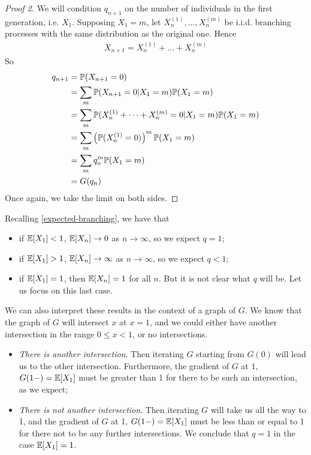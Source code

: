 \documentclass{../../template/note}
\begin{document}
    \begin{proof}[Proof 2]
        We will condition \(q_{n+1}\) on the number of individuals in the first generation, i.e. \(X_1\). Supposing \(X_1 = m\), let \(X_n^{(1)}, \dots, X_n^{(m)}\) be i.i.d. branching processes with the same distribution as the original one. Hence
        \begin{align*}
            X_{n+1} = X_n^{(1)} + \dots + X_n^{(m)}
        \end{align*}
        So
        \begin{align*}
            q_{n+1} &= \mathbb P(X_{n+1} = 0) \\
            &= \sum_m \mathbb P(X_{n+1} = 0 | X_1 = m) \mathbb P(X_1 = m) \\
            &= \sum_m \mathbb P(X_n^{(1)} + \dots + X_n^{(m)} = 0 | X_1 = m) \mathbb P(X_1 = m) \\
            &= \sum_m \left(\mathbb P(X_n^{(1)} = 0)\right)^m \mathbb P(X_1 = m) \\
            &= \sum_m q_n^m \mathbb P(X_1 = m) \\ &= G(q_n)
        \end{align*}
        Once again, we take the limit on both sides.
    \end{proof}

    
    Recalling \cref{expected-branching}, we have that
    \begin{itemize}
        \item if \(\mathbb E[X_1] < 1\), \(\mathbb E[X_n] \to 0\) as \(n \to \infty\), so we expect \(q=1\);
        \item if \(\mathbb E[X_1] > 1\), \(\mathbb E[X_n] \to \infty\) as \(n \to \infty\), so we expect \(q<1\);
        \item if \(\mathbb E[X_1] = 1\), then \(\mathbb E[X_n] = 1\) for all \(n\). But it is not clear what \(q\) will be. Let us focus on this last case.
    \end{itemize}

    We can also interpret these results in the context of a graph of \(G\). We know that the graph of \(G\) will intersect \(x\) at \(x=1\), and we could either have another intersection in the range \(0 \leq x < 1\), or no intersections.

    \begin{itemize}
        \item \emph{There is another intersection}. Then iterating \(G\) starting from \(G(0)\) will lead us to the other intersection. Furthermore, the gradient of \(G\) at \(1\), \(G(1-) = \mathbb E[X_1]\) must be greater than 1 for there to be such an intersection, as we expect;
        \item \emph{There is not another intersection}. Then iterating \(G\) will take us all the way to 1, and the gradient of \(G\) at 1, \(G(1-) = \mathbb E[X_1]\) must be less than or equal to 1 for there not to be any further intersections. We conclude that \(q = 1\) in the case \(\mathbb E[X_1] = 1\).
    \end{itemize}
    
\end{document}

